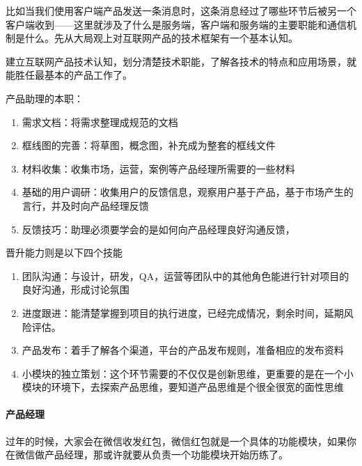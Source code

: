 \documentclass[letterpaper,11pt,english]{sphinxmanual}
\begin{document}
比如当我们使用客户端产品发送一条消息时，这条消息经过了哪些环节后被另一个客户端收到——这里就涉及了什么是服务端，客户端和服务端的主要职能和通信机制是什么。先从大局观上对互联网产品的技术框架有一个基本认知。

建立互联网产品技术认知，划分清楚技术职能，了解各技术的特点和应用场景，就能胜任最基本的产品工作了。

产品助理的本职： %
\begin{footnote}[208]\sphinxAtStartFootnote
{}
%
\end{footnote}
\begin{enumerate}
%
\item {} 
需求文档：将需求整理成规范的文档

\item {} 
框线图的完善：将草图，概念图，补充成为整套的框线文件

\item {} 
材料收集：收集市场，运营，案例等产品经理所需要的一些材料

\item {} 
基础的用户调研：收集用户的反馈信息，观察用户基于产品，基于市场产生的言行，并及时向产品经理反馈

\item {} 
反馈技巧：助理必须要学会的是如何向产品经理良好沟通反馈，

\end{enumerate}

晋升能力则是以下四个技能
\begin{enumerate}
%
\item {} 
团队沟通：与设计，研发，QA，运营等团队中的其他角色能进行针对项目的良好沟通，形成讨论氛围

\item {} 
进度跟进：能清楚掌握到项目的执行进度，已经完成情况，剩余时间，延期风险评估。

\item {} 
产品发布：着手了解各个渠道，平台的产品发布规则，准备相应的发布资料

\item {} 
小模块的独立策划：这个环节需要的不仅仅是创新思维，更重要的是在一个小模块的环境下，去探索产品思维，要知道产品思维是个很全很宽的面性思维

\end{enumerate}


\paragraph{产品经理}
\label{\detokenize{chapter_experience/career_path:id4}}
过年的时候，大家会在微信收发红包，微信红包就是一个具体的功能模块，如果你在微信做产品经理，那或许就要从负责一个功能模块开始历练了。
\end{document}
